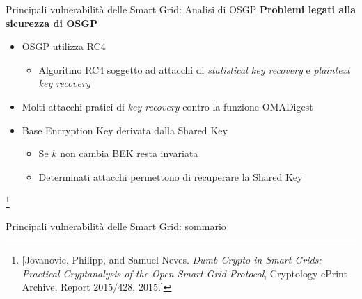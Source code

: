 
\begin{frame}{Principali vulnerabilità delle Smart Grid: Analisi di OSGP}
	\textbf{Problemi legati alla sicurezza di OSGP}
	\begin{itemize}[<+- | alert@+>]
		\item OSGP utilizza RC4
		\begin{itemize}
			\item Algoritmo RC4 soggetto ad attacchi di \emph{statistical key recovery} e \emph{plaintext key recovery}
		\end{itemize}
		\item Molti attacchi pratici di \textit{key-recovery} contro la funzione OMADigest
		\item Base Encryption Key derivata dalla Shared Key
			\begin{itemize}
				\item Se $k$ non cambia BEK resta invariata
				\item Determinati attacchi permettono di recuperare la Shared Key
			\end{itemize}
	\end{itemize}
	\let\thefootnote\relax\footnote{[Jovanovic, Philipp, and Samuel Neves. \emph{Dumb Crypto in Smart Grids: Practical Cryptanalysis of the Open Smart Grid Protocol}, Cryptology ePrint Archive, Report 2015/428, 2015.]}
\end{frame}

\begin{frame}{Principali vulnerabilità delle Smart Grid: sommario}
\end{frame}

